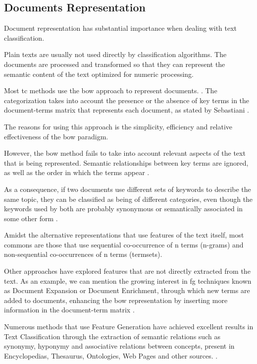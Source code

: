 \subsection{\hspace*{3pt}Documents Representation}

Document representation has substantial importance when dealing with text classification.

Plain texts are usually not used directly by classification algorithms.  The documents are processed and transformed so that they can represent the semantic content of the text optimized for numeric processing.   

Most \gls{tc} methods use the \gls{bow} approach to represent documents. \cite{Lan:2009} \cite{Manning:2008}. The categorization takes into account the presence or the absence of key terms in the document-terms matrix that represents each document, as stated by Sebastiani \cite{Sebastiani:2002}.

The reasons for using this approach is the simplicity, efficiency and relative effectiveness of the \gls{bow} paradigm.

However, the \gls{bow} method fails to take into account relevant aspects of the text that is being represented. Semantic relationships between key terms are ignored, as well as the order in which the terms appear \cite{Gabrilovich:2005, Lan:2009}.

As a consequence, if two documents use different sets of keywords to describe the same topic, they can be classified as being of different categories, even though the keywords used by both are probably synonymous or semantically associated in some other form \cite {Hu:2009}.

Amidst the alternative representations that use features of the text itself, most commons are those that use sequential co-occurrence of n terms (n-grams) and non-sequential co-occurrences of n terms (termsets). 

Other approaches have explored features that are not directly extracted from the text. As an example, we can mention the growing interest in \gls{fg} techniques known as Document Expansion or Document Enrichment, through which new terms are added to documents, enhancing the \gls{bow} representation by inserting more information in the document-term matrix \cite {Gabrilovich:2005}.

Numerous methods that use Feature Generation have achieved excellent results in Text Classification through the extraction of semantic relations such as synonymy, hyponymy and associative relations between concepts, present in Encyclopedias, Thesaurus, Ontologies, Web Pages and other sources. \cite{Gabrilovich:2005,Gabrilovich:2006,Hu:2008,Wang:2008, Wang:2009}.


